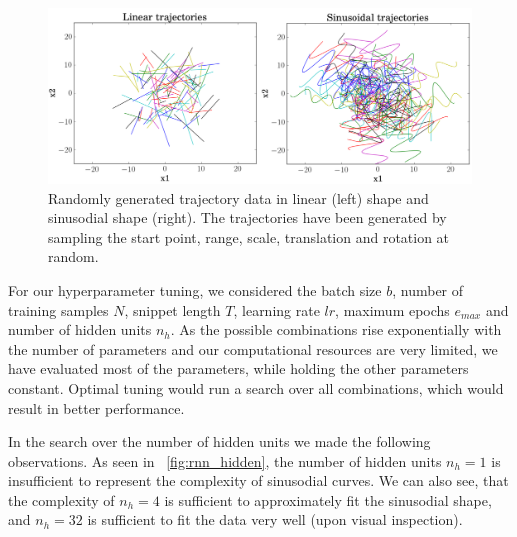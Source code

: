 \begin{figure}
	\centering
	\includegraphics [trim=0 0 0 0, clip, angle=0, width=1.0\columnwidth,
	keepaspectratio]{figures/lin_sin_traj}
	\caption{Randomly generated trajectory data in linear (left) shape and sinusodial shape (right). The trajectories have been generated by sampling the start point, range, scale, translation and rotation at random.} 
	\label{fig:lin_sin_traj} 
\end{figure}
For our hyperparameter tuning, we considered the batch size $b$, number of training samples $N$, snippet length $T$, learning rate $lr$, maximum epochs $e_{max}$ and number of hidden units $n_h$. 
As the possible combinations rise exponentially with the number of parameters and our computational resources are very limited, we have evaluated most of the parameters, while holding the other parameters constant.
Optimal tuning would run a search over all combinations, which would result in better performance.

In the search over the number of hidden units we made the following observations.
As seen in ~\cref{fig:rnn_hidden}, the number of hidden units $n_h = 1$ is insufficient to represent the complexity of sinusodial curves.
We can also see, that the complexity of $n_h=4$ is sufficient to approximately fit the sinusodial shape, and $n_h=32$ is sufficient to fit the data very well (upon visual inspection).

